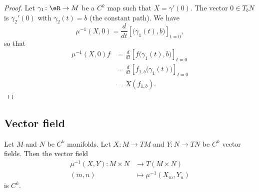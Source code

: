 \begin{proof}
	Let \(\gamma_1 \colon \eR\to M  \) be a \( C^k\) map such that \( X=\gamma'(0)\). The vector \( 0\in T_bN\) is \( \gamma_2'(0)\) with \( \gamma_2(t)=b\) (the constant path). We have
	\begin{equation}
		\mu^{-1}(X,0)=\frac{d}{dt} \left[ \big( \gamma_1(t),b \big)  \right]_{t=0},
	\end{equation}
	so that
	\begin{subequations}
		\begin{align}
			\mu^{-1}(X,0)f & =\frac{d}{dt} \left[ f\big( \gamma_1(t),b \big)  \right]_{t=0}     \\
			               & =\frac{d}{dt} \left[ f_{1,b}\big( \gamma_1(t) \big)  \right]_{t=0} \\
			               & =X(f_{1,b}).
		\end{align}
	\end{subequations}
\end{proof}


\subsection{Vector field}

\begin{proposition}	\label{PROPooKGDFooQeEVOl}
	Let \( M\) and \( N\) be \( C^k\) manifolds. Let \(X \colon M\to TM  \) and \(Y \colon N\to TN  \) be \( C^k\) vector fields. Then the vector field
	\begin{equation}
		\begin{aligned}
			\mu^{-1}(X,Y)\colon M\times N & \to T(M\times N)          \\
			(m,n)                         & \mapsto \mu^{-1}(X_m,Y_n)
		\end{aligned}
	\end{equation}
	is \( C^k\).
\end{proposition}

